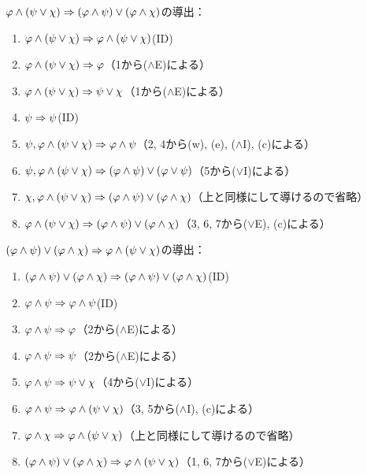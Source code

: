 \(\varphi \land \paren{\psi \lor \chi} \sequent \paren{\varphi \land \psi} \lor \paren{\varphi \land \chi}\)の導出：
\begin{enumerate}
	\item \(\varphi \land \paren{\psi \lor \chi} \sequent \varphi \land \paren{\psi \lor \chi}\)\quad (ID)
	\item \(\varphi \land \paren{\psi \lor \chi} \sequent \varphi\)\quad （1から(\(\land\)E)による）
	\item \(\varphi \land \paren{\psi \lor \chi} \sequent \psi \lor \chi\)\quad （1から(\(\land\)E)による）
	\item \(\psi \Rightarrow \psi\)\quad (ID)
	\item \(\psi, \varphi \land \paren{\psi \lor \chi} \sequent \varphi \land \psi\)\quad （2, 4から(w), (e), (\(\land\)I), (c)による）
	\item \(\psi, \varphi \land \paren{\psi \lor \chi} \sequent \paren{\varphi \land \psi} \lor \paren{\varphi \lor \psi}\)\quad （5から(\(\lor\)I)による）
	\item \(\chi, \varphi \land \paren{\psi \lor \chi} \sequent \paren{\varphi \land \psi} \lor \paren{\varphi \land \chi}\)\quad （上と同様にして導けるので省略）
	\item \(\varphi \land \paren{\psi \lor \chi} \sequent \paren{\varphi \land \psi} \lor \paren{\varphi \land \chi}\)\quad （3, 6, 7から(\(\lor\)E), (c)による）
\end{enumerate}

\(\paren{\varphi \land \psi} \lor \paren{\varphi \land \chi} \sequent \varphi \land \paren{\psi \lor \chi}\)の導出：
\begin{enumerate}
	\item \(\paren{\varphi \land \psi} \lor \paren{\varphi \land \chi} \sequent \paren{\varphi \land \psi} \lor \paren{\varphi \land \chi}\)\quad (ID)
	\item \(\varphi \land \psi \Rightarrow \varphi \land \psi\)\quad (ID)
	\item \(\varphi \land \psi \Rightarrow \varphi\)\quad （2から(\(\land\)E)による）
	\item \(\varphi \land \psi \Rightarrow \psi\)\quad （2から(\(\land\)E)による）
	\item \(\varphi \land \psi \Rightarrow \psi \lor \chi\)\quad （4から(\(\lor\)I)による）
	\item \(\varphi \land \psi \sequent \varphi \land \paren{\psi \lor \chi}\)\quad （3, 5から(\(\land\)I), (c)による）
	\item \(\varphi \land \chi \sequent \varphi \land \paren{\psi \lor \chi}\)\quad （上と同様にして導けるので省略）
	\item \(\paren{\varphi \land \psi} \lor \paren{\varphi \land \chi} \sequent \varphi \land \paren{\psi \lor \chi}\)\quad （1, 6, 7から(\(\lor\)E)による）
\end{enumerate}

